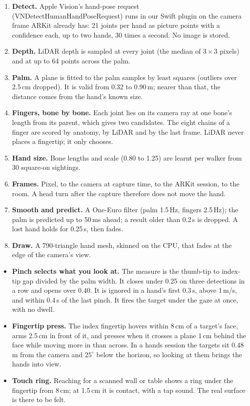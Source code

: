 \documentclass[10pt]{article}
\newcounter{sec}
\newcommand{\Sub}[1]{\Needspace{18mm}\vspace{2.5mm}\noindent{\bfseries\color{accD}#1}\par\vspace{0.3mm}}
\newcommand{\code}[1]{{\ttfamily\fontsize{8.8}{11}\selectfont #1}}
\begin{document}
\begin{enumerate}
\item \textbf{Detect.} Apple Vision's hand-pose request (\code{VNDetectHumanHandPoseRequest}) runs in our Swift plugin on the camera frame ARKit already has: 21 joints per hand as picture points with a confidence each, up to two hands, 30 times a second. No image is stored.
\item \textbf{Depth.} LiDAR depth is sampled at every joint (the median of $3\times3$ pixels) and at up to 64 points across the palm.
\item \textbf{Palm.} A plane is fitted to the palm samples by least squares (outliers over 2.5\,cm dropped). It is valid from 0.32 to 0.90\,m; nearer than that, the distance comes from the hand's known size.
\item \textbf{Fingers, bone by bone.} Each joint lies on its camera ray at one bone's length from its parent, which gives two candidates. The eight chains of a finger are scored by anatomy, by LiDAR and by the last frame. LiDAR never places a fingertip; it only chooses.
\item \textbf{Hand size.} Bone lengths and scale (0.80 to 1.25) are learnt per walker from 30 square-on sightings.
\item \textbf{Frames.} Pixel, to the camera at capture time, to the ARKit session, to the room. A head turn after the capture therefore does not move the hand.
\item \textbf{Smooth and predict.} A One-Euro filter (palm 1.5\,Hz, fingers 2.5\,Hz); the palm is predicted up to 50\,ms ahead; a result older than 0.2\,s is dropped. A lost hand holds for 0.25\,s, then fades.
\item \textbf{Draw.} A 790-triangle hand mesh, skinned on the CPU, that fades at the edge of the camera's view.
\end{enumerate}

\Sub{Gestures}

\begin{itemize}
\item \textbf{Pinch selects what you look at.} The measure is the thumb-tip to index-tip gap divided by the palm width. It closes under 0.25 on three detections in a row and opens over 0.40. It is ignored in a hand's first 0.3\,s, above 1\,m/s, and within 0.4\,s of the last pinch. It fires the target under the gaze at once, with no dwell.
\item \textbf{Fingertip press.} The index fingertip hovers within 8\,cm of a target's face, arms 2.5\,cm in front of it, and presses when it crosses a plane 1\,cm behind the face while moving more in than across. In a hands session the targets sit 0.48\,m from the camera and $25^\circ$ below the horizon, so looking at them brings the hands into view.
\item \textbf{Touch ring.} Reaching for a scanned wall or table shows a ring under the fingertip from 8\,cm; at 1.5\,cm it is contact, with a tap sound. The real surface is there to be felt.
\end{itemize}
\end{document}
